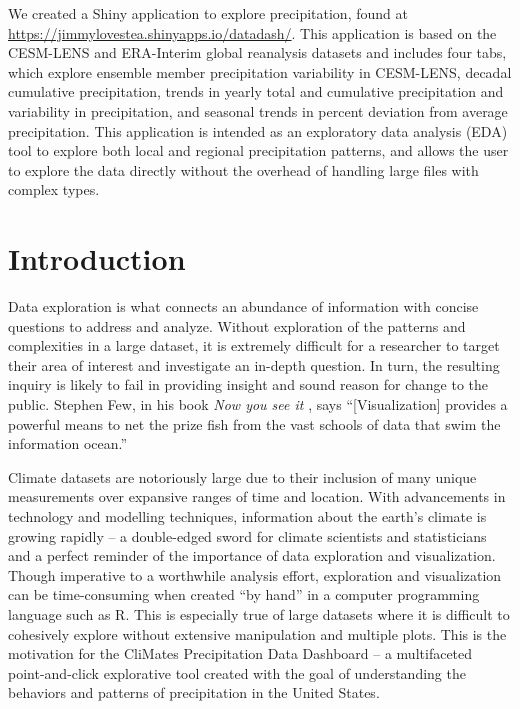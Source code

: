 \documentclass[10pt,letterpaper]{article}
\begin{document}
We created a Shiny application to explore precipitation, found at \href{https://jimmylovestea.shinyapps.io/datadash/}{https://jimmylovestea.shinyapps.io/datadash/}. This application is based on the CESM-LENS and ERA-Interim global reanalysis datasets and includes four tabs, which explore ensemble member precipitation variability in CESM-LENS, decadal cumulative precipitation, trends in yearly total and cumulative precipitation and variability in precipitation, and seasonal trends in percent deviation from average precipitation. This application is intended as an exploratory data analysis (EDA) tool to explore both local and regional precipitation patterns, and allows the user to explore the data directly without the overhead of handling large files with complex types.



\linenumbers

\section*{Introduction}

Data exploration is what connects an abundance of information with concise questions to address and analyze. Without exploration of the patterns and complexities in a large dataset, it is extremely difficult for a researcher to target their area of interest and investigate an in-depth question. In turn, the resulting inquiry is likely to fail in providing insight and sound reason for change to the public. Stephen Few, in his book \textit{Now you see it} \cite{few_2009}, says “[Visualization] provides a powerful means to net the prize fish from the vast schools of data that swim the information ocean.”

Climate datasets are notoriously large due to their inclusion of many unique measurements over expansive ranges of time and location. With advancements in technology and modelling techniques, information about the earth’s climate is growing rapidly – a double-edged sword for climate scientists and statisticians and a perfect reminder of the importance of data exploration and visualization.
Though imperative to a worthwhile analysis effort, exploration and visualization can be time-consuming when created “by hand” in a computer programming language such as R. This is especially true of large datasets where it is difficult to cohesively explore without extensive manipulation and multiple plots. This is the motivation for the CliMates Precipitation Data Dashboard – a multifaceted point-and-click explorative tool created with the goal of understanding the behaviors and patterns of precipitation in the United States.
\end{document}
